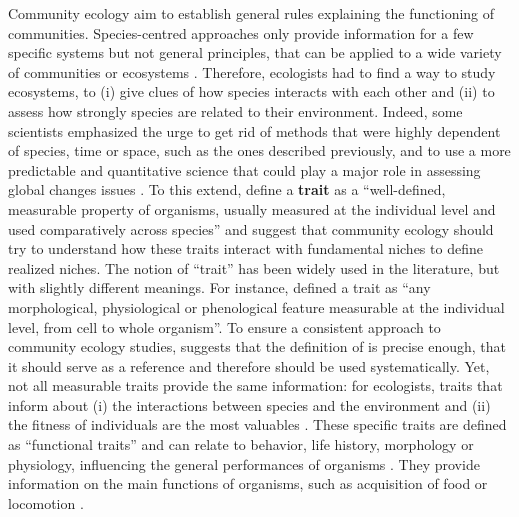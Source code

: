 Community ecology aim to establish general rules explaining the functioning of communities. Species-centred approaches only provide information for a few specific systems but not general principles, that can be applied to a wide variety of communities or ecosystems \citep{albouy2011,martini2020}. Therefore, ecologists had to find a way to study ecosystems, to (i) give clues of how species interacts with each other and (ii) to assess how strongly species are related to their environment. Indeed, some scientists emphasized the urge to get rid of methods that were highly dependent of species, time or space, such as the ones described previously, and to use a more predictable and quantitative science that could play a major role in assessing global changes issues \citep{brindamour2011,mcgill2006,olden2002}. To this extend, \citet{mcgill2006} define a \textbf{trait} as a “well-defined, measurable property of organisms, usually measured at the individual level and used comparatively across species” and suggest that community ecology should try to understand how these traits interact with fundamental niches to define realized niches. The notion of ``trait'' has been widely used in the literature, but with slightly different meanings. For instance, \citet{violle2007} defined a trait as “any morphological, physiological or phenological feature measurable at the individual level, from cell to whole organism”. To ensure a consistent approach to community ecology studies, \citet{martini2020} suggests that the definition of \citet{violle2007} is precise enough, that it should serve as a reference and therefore should be used systematically. Yet, not all measurable traits provide the same information: for ecologists, traits that inform about (i) the interactions between species and the environment and (ii) the fitness of individuals are the most valuables \citep{kremer2017}. These specific traits are defined as “functional traits” and can relate to behavior, life history, morphology or physiology, influencing the general performances of organisms \citet{martini2020, mcgill2006}. They provide information on the main functions of organisms, such as acquisition of food or locomotion \citep{mejri2009}.

